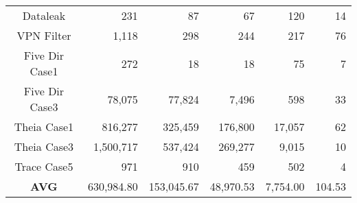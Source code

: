 \begin{table}[!htb]
{\begin{tabular}{crrrrr}
Dataleak             & 231                              & 87                                    & 67                                       & 120                                 & 14                                   \\
VPN Filter            & 1,118                            & 298                                   & 244                                      & 217                                 & 76                                   \\
Five Dir Case1       & 272                              & 18                                    & 18                                       & 75                                  & 7                                    \\
Five Dir Case3       & 78,075                           & 77,824                                & 7,496                                    & 598                                 & 33                                   \\
Theia Case1          & 816,277                          & 325,459                               & 176,800                                  & 17,057                              & 62                                   \\
Theia Case3          & 1,500,717                        & 537,424                               & 269,277                                  & 9,015                               & 10                                   \\
Trace Case5          & 971                              & 910                                   & 459                                      & 502                                 & 4                                    \\
\textbf{AVG}         & 630,984.80                       & 153,045.67                            & 48,970.53                                & 7,754.00                            & 104.53   \\ \hline                           
\end{tabular}
}
\end{table}